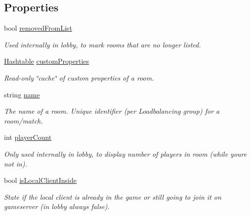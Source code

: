 \subsection*{Properties}
\begin{DoxyCompactItemize}
\item 
bool \hyperlink{class_room_info_af0811895b3b40f2b64d243d5fd8fd362}{removed\+From\+List}
\begin{DoxyCompactList}\small\item\em Used internally in lobby, to mark rooms that are no longer listed.\end{DoxyCompactList}\item 
\hyperlink{_extensions_8cs_afa613ef589c02dbd94acc273b62cdcfd}{Hashtable} \hyperlink{class_room_info_a928b103a3e88d2c090152440aa6fa874}{custom\+Properties}
\begin{DoxyCompactList}\small\item\em Read-\/only \char`\"{}cache\char`\"{} of custom properties of a room. \end{DoxyCompactList}\item 
string \hyperlink{class_room_info_a77189ececa62ba47ff70359fd2db9af5}{name}
\begin{DoxyCompactList}\small\item\em The name of a room. Unique identifier (per Loadbalancing group) for a room/match.\end{DoxyCompactList}\item 
int \hyperlink{class_room_info_a211655578d31b9fed0817cad42e8f0b5}{player\+Count}
\begin{DoxyCompactList}\small\item\em Only used internally in lobby, to display number of players in room (while you\textquotesingle{}re not in). \end{DoxyCompactList}\item 
bool \hyperlink{class_room_info_a1e862ae572d36aba8d35f57241450082}{is\+Local\+Client\+Inside}
\begin{DoxyCompactList}\small\item\em State if the local client is already in the game or still going to join it on gameserver (in lobby always false). \end{DoxyCompactList}\item 

\end{DoxyCompactItemize}
